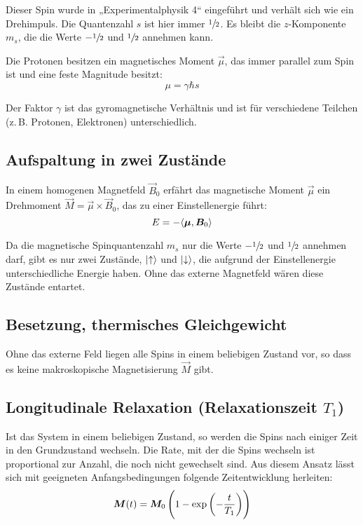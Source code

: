Dieser Spin wurde in „Experimentalphysik 4“ eingeführt und verhält sich wie ein
Drehimpuls. Die Quantenzahl $s$ ist hier immer $\sfrac12$. Es bleibt die
$z$-Komponente $m_s$, die die Werte $-\sfrac12$ und $\sfrac12$ annehmen kann.

Die Protonen besitzen ein magnetisches Moment $\vec\mu$, das immer parallel zum
Spin ist und eine feste Magnitude besitzt:
\[
    \mu = \gamma \hbar s
\]

Der Faktor $\gamma$ ist das gyromagnetische Verhältnis und ist für verschiedene
Teilchen (z.\,B. Protonen, Elektronen) unterschiedlich.

\subsection{Aufspaltung in zwei Zustände}

In einem homogenen Magnetfeld $\vec B_0$ erfährt das magnetische Moment
$\vec\mu$ ein Drehmoment $\vec M = \vec \mu \times \vec B_0$, das zu einer
Einstellenergie führt:
\[
    E = - \langle \boldsymbol{\mu}, \boldsymbol{B}_0 \rangle
\]

Da die magnetische Spinquantenzahl $m_s$ nur die Werte $-\sfrac12$ und
$\sfrac12$ annehmen darf, gibt es nur zwei Zustände, $\ket\uparrow$ und
$\ket\downarrow$, die aufgrund der Einstellenergie unterschiedliche Energie
haben. Ohne das externe Magnetfeld wären diese Zustände entartet.

\subsection{Besetzung, thermisches Gleichgewicht}

Ohne das externe Feld liegen alle Spins in einem beliebigen Zustand vor, so
dass es keine makroskopische Magnetisierung $\vec M$ gibt.

\subsection{Longitudinale Relaxation (Relaxationszeit $T_1$)}

Ist das System in einem beliebigen Zustand, so werden die Spins nach einiger
Zeit in den Grundzustand wechseln. Die Rate, mit der die Spins wechseln ist
proportional zur Anzahl, die noch nicht gewechselt sind. Aus diesem Ansatz
lässt sich mit geeigneten Anfangsbedingungen folgende Zeitentwicklung
herleiten: \parencite[Formel~P443.2]{physik412-Anleitung}
\begin{equation}
    \label{eq:M/exp}
    \vec M(t) = \vec M_0 \del{1 - \exp\del{- \frac{t}{T_1}}}
\end{equation}

